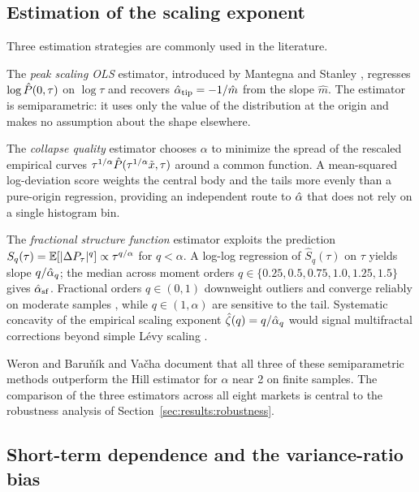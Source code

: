 \documentclass[12pt,a4paper]{article}
\begin{document}
\subsection{Estimation of the scaling exponent}
\label{sec:background:estimation}

Three estimation strategies are commonly used in the literature.

The \textit{peak scaling OLS} estimator, introduced by
Mantegna and Stanley \cite{MantegnaStanley1994}, regresses $\log\hat{P}(0,\tau)$ on $\log\tau$ and
recovers $\hat{\alpha}_{\mathrm{tip}} = -1/\hat{m}$ from the slope $\hat{m}$.
The estimator is semiparametric: it uses only the value of the distribution
at the origin and makes no assumption about the shape elsewhere.

The \textit{collapse quality} estimator \cite{Drozdz2003} chooses
$\alpha$ to minimize the spread of the rescaled empirical curves
$\tau^{1/\alpha}\hat{P}(\tau^{1/\alpha}\tilde{x},\tau)$ around a common function.
A mean-squared log-deviation score weights the central body and the tails
more evenly than a pure-origin regression, providing an independent route to
$\hat{\alpha}$ that does not rely on a single histogram bin.

The \textit{fractional structure function} estimator
\cite{MuzyBacry1993,BouchaudPotters2003} exploits the prediction
$S_q(\tau) = \mathbb{E}[|\Delta P_\tau|^q] \propto \tau^{q/\alpha}$ for $q <
\alpha$. A log-log regression of $\hat{S}_q(\tau)$ on $\tau$ yields
slope $q/\hat{\alpha}_q$; the median across moment orders
$q\in\{0.25,0.5,0.75,1.0,1.25,1.5\}$ gives $\hat{\alpha}_{\mathrm{sf}}$.
Fractional orders $q\in(0,1)$ downweight outliers and converge reliably on
moderate samples \cite{Uchaikin2003}, while $q\in(1,\alpha)$ are
sensitive to the tail. Systematic concavity of the empirical scaling exponent
$\hat\zeta(q) = q/\hat{\alpha}_q$ would signal multifractal corrections beyond
simple Lévy scaling \cite{Mandelbrot1997,MuzyBacry1993}.

Weron \cite{Weron2001} and Baru\v{n}\'ik and Va\v{c}ha \cite{Barunik2010} document that all three of
these semiparametric methods outperform the Hill estimator for $\alpha$ near
2 on finite samples. The comparison of the three estimators across all eight
markets is central to the robustness analysis of Section~\ref{sec:results:robustness}.

\subsection{Short-term dependence and the variance-ratio bias}
\label{sec:background:vr}
\end{document}
